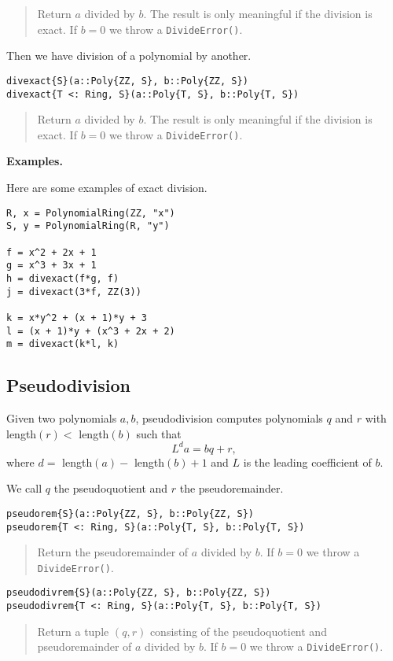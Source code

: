 \documentclass[a4paper,10pt]{article}
\newcommand{\code}{\lstinline}
\newcommand{\desc}[1]{\vspace{-3mm}\begin{quote}#1\end{quote}}
\begin{document}
{{{\desc{Return $a$ divided by $b$. The result is only meaningful if the division is
exact. If $b = 0$ we throw a \code{DivideError()}.}

Then we have division of a polynomial by another.

\begin{lstlisting}
divexact{S}(a::Poly{ZZ, S}, b::Poly{ZZ, S})
divexact{T <: Ring, S}(a::Poly{T, S}, b::Poly{T, S})
\end{lstlisting}

\desc{Return $a$ divided by $b$. The result is only meaningful if the division is
exact. If $b = 0$ we throw a \code{DivideError()}.}

\textbf{Examples.}

Here are some examples of exact division.

\begin{lstlisting}
R, x = PolynomialRing(ZZ, "x")
S, y = PolynomialRing(R, "y")

f = x^2 + 2x + 1
g = x^3 + 3x + 1
h = divexact(f*g, f)
j = divexact(3*f, ZZ(3))

k = x*y^2 + (x + 1)*y + 3
l = (x + 1)*y + (x^3 + 2x + 2)
m = divexact(k*l, k)
\end{lstlisting}

\subsection{Pseudodivision}

Given two polynomials $a, b$, pseudodivision computes polynomials $q$ and $r$
with length$(r) <$ length$(b)$ such that
$$L^d a = bq + r,$$
where $d =$ length$(a) -$ length$(b) + 1$ and $L$ is the leading coefficient
of $b$.

We call $q$ the pseudoquotient and $r$ the pseudoremainder.

\begin{lstlisting}
pseudorem{S}(a::Poly{ZZ, S}, b::Poly{ZZ, S})
pseudorem{T <: Ring, S}(a::Poly{T, S}, b::Poly{T, S})
\end{lstlisting}

\desc{Return the pseudoremainder of $a$ divided by $b$. If $b = 0$ we throw a 
\code{DivideError()}.}

\begin{lstlisting}
pseudodivrem{S}(a::Poly{ZZ, S}, b::Poly{ZZ, S})
pseudodivrem{T <: Ring, S}(a::Poly{T, S}, b::Poly{T, S})
\end{lstlisting}

\desc{Return a tuple $(q, r)$ consisting of the pseudoquotient and pseudoremainder 
of $a$ divided by $b$. If $b = 0$ we throw a \code{DivideError()}.}

}}}
\end{document}
